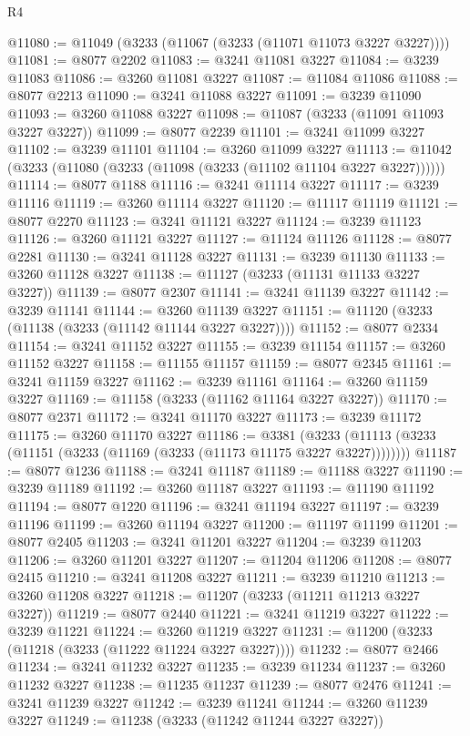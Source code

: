 \begin{lexlean}{R4}
\begin{coremodule}
@11080 := @11049 (@3233 (@11067 (@3233 (@11071 @11073 @3227 @3227))))
@11081 := @8077 @2202
@11083 := @3241 @11081 @3227
@11084 := @3239 @11083
@11086 := @3260 @11081 @3227
@11087 := @11084 @11086
@11088 := @8077 @2213
@11090 := @3241 @11088 @3227
@11091 := @3239 @11090
@11093 := @3260 @11088 @3227
@11098 := @11087 (@3233 (@11091 @11093 @3227 @3227))
@11099 := @8077 @2239
@11101 := @3241 @11099 @3227
@11102 := @3239 @11101
@11104 := @3260 @11099 @3227
@11113 := @11042 (@3233 (@11080 (@3233 (@11098 (@3233 (@11102 @11104 @3227 @3227))))))
@11114 := @8077 @1188
@11116 := @3241 @11114 @3227
@11117 := @3239 @11116
@11119 := @3260 @11114 @3227
@11120 := @11117 @11119
@11121 := @8077 @2270
@11123 := @3241 @11121 @3227
@11124 := @3239 @11123
@11126 := @3260 @11121 @3227
@11127 := @11124 @11126
@11128 := @8077 @2281
@11130 := @3241 @11128 @3227
@11131 := @3239 @11130
@11133 := @3260 @11128 @3227
@11138 := @11127 (@3233 (@11131 @11133 @3227 @3227))
@11139 := @8077 @2307
@11141 := @3241 @11139 @3227
@11142 := @3239 @11141
@11144 := @3260 @11139 @3227
@11151 := @11120 (@3233 (@11138 (@3233 (@11142 @11144 @3227 @3227))))
@11152 := @8077 @2334
@11154 := @3241 @11152 @3227
@11155 := @3239 @11154
@11157 := @3260 @11152 @3227
@11158 := @11155 @11157
@11159 := @8077 @2345
@11161 := @3241 @11159 @3227
@11162 := @3239 @11161
@11164 := @3260 @11159 @3227
@11169 := @11158 (@3233 (@11162 @11164 @3227 @3227))
@11170 := @8077 @2371
@11172 := @3241 @11170 @3227
@11173 := @3239 @11172
@11175 := @3260 @11170 @3227
@11186 := @3381
    (@3233 (@11113 (@3233 (@11151 (@3233 (@11169 (@3233 (@11173 @11175 @3227 @3227))))))))
@11187 := @8077 @1236
@11188 := @3241 @11187
@11189 := @11188 @3227
@11190 := @3239 @11189
@11192 := @3260 @11187 @3227
@11193 := @11190 @11192
@11194 := @8077 @1220
@11196 := @3241 @11194 @3227
@11197 := @3239 @11196
@11199 := @3260 @11194 @3227
@11200 := @11197 @11199
@11201 := @8077 @2405
@11203 := @3241 @11201 @3227
@11204 := @3239 @11203
@11206 := @3260 @11201 @3227
@11207 := @11204 @11206
@11208 := @8077 @2415
@11210 := @3241 @11208 @3227
@11211 := @3239 @11210
@11213 := @3260 @11208 @3227
@11218 := @11207 (@3233 (@11211 @11213 @3227 @3227))
@11219 := @8077 @2440
@11221 := @3241 @11219 @3227
@11222 := @3239 @11221
@11224 := @3260 @11219 @3227
@11231 := @11200 (@3233 (@11218 (@3233 (@11222 @11224 @3227 @3227))))
@11232 := @8077 @2466
@11234 := @3241 @11232 @3227
@11235 := @3239 @11234
@11237 := @3260 @11232 @3227
@11238 := @11235 @11237
@11239 := @8077 @2476
@11241 := @3241 @11239 @3227
@11242 := @3239 @11241
@11244 := @3260 @11239 @3227
@11249 := @11238 (@3233 (@11242 @11244 @3227 @3227))

\end{coremodule}
\end{lexlean}
